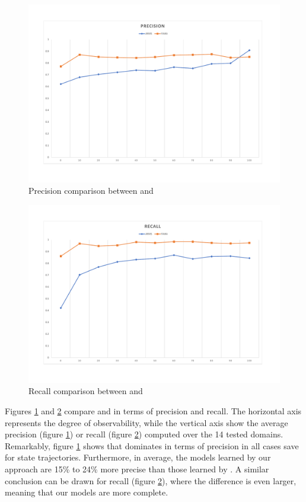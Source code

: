 \begin{figure}[hbt!]
	\centering
	\includegraphics[width=.8\linewidth]{figures/comparison_precision.pdf}
	\caption{Precision comparison between \FAMA and \ARMS}
	\label{fig:comparison_precision}
\end{figure}

\begin{figure}[hbt!]
	\centering
	\includegraphics[width=.8\linewidth]{figures/comparison_recall.pdf}
	\caption{Recall comparison between \FAMA and \ARMS}
	\label{fig:comparison_recall}
\end{figure}

Figures \ref{fig:comparison_precision} and \ref{fig:comparison_recall} compare \FAMA and \ARMS in terms of precision and recall. The horizontal axis represents the degree of observability, while the vertical axis show the average precision (figure \ref{fig:comparison_precision}) or recall (figure \ref{fig:comparison_recall}) computed over the 14 tested domains. Remarkably, figure \ref{fig:comparison_precision} shows that \FAMA dominates in terms of precision in all cases save for \FO state trajectories. Furthermore, in average, the models learned by our approach are 15\% to 24\% more precise than those learned by \ARMS. A similar conclusion can be drawn for recall (figure \ref{fig:comparison_recall}), where the difference is even larger, meaning that our models are more complete.

